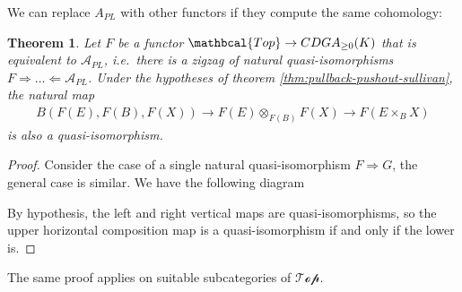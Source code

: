 \documentclass{scrartcl}
\theoremstyle{plain}
\newtheorem{theorem}{Theorem}[section]
\theoremstyle{definition}
\newcommand{\cat}[1]{\mathbcal{#1}}
\newcommand{\Apl}{\mathcal A_{PL}}
\newcommand{\from}{\leftarrow}
\newcommand{\nto}{\Rightarrow}
\newcommand{\nfrom}{\Leftarrow}
\begin{document}
We can replace $A_{PL}$ with other functors if they compute the same cohomology:
\begin{theorem}
    Let $F$ be a functor $\cat{Top}\to CDGA_{\geq 0}(K)$ that is equivalent to $\Apl$, i.e.\ there is a zigzag of natural quasi-isomorphisms $F \nto \dots \nfrom \Apl$. Under the hypotheses of theorem \ref{thm:pullback-pushout-sullivan}, the natural map 
    \begin{align*}
        B(F(E), F(B), F(X)) \to F(E)\otimes_{F(B)} F(X) \to F(E\times_B X)
    \end{align*}
    is also a quasi-isomorphism.
\end{theorem}
\begin{proof}
    Consider the case of a single natural quasi-isomorphism $F \nto G$, the general case is similar. We have the following diagram
    \begin{center}
    \end{center}
    By hypothesis, the left and right vertical maps are quasi-isomorphisms, so the upper horizontal composition map is a quasi-isomorphism if and only if the lower is.
\end{proof}
The same proof applies on suitable subcategories of $\mathcal{Top}$.






\end{document}
